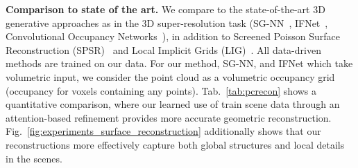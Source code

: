 \smallskip
\noindent \textbf{Comparison to state of the art.}
We compare to the state-of-the-art 3D generative approaches as in the 3D super-resolution task (SG-NN~\cite{dai2020sg}, IFNet~\cite{chibane2020implicit}, Convolutional Occupancy Networks~\cite{peng2020convolutional}), in addition to Screened Poisson Surface Reconstruction (SPSR)~\cite{kazhdan2006poisson,kazhdan2013screened} and Local Implicit Grids (LIG)~\cite{jiang2020local}.
%
All data-driven methods are trained on our data.
%
For our method, SG-NN, and IFNet which take volumetric input, we consider the point cloud as a volumetric occupancy grid (occupancy for voxels containing any points). 
%
Tab.~\ref{tab:pcrecon} shows a quantitative comparison, where our learned use of train scene data through an attention-based refinement provides more accurate geometric reconstruction.
%
Fig.~\ref{fig:experiments_surface_reconstruction} additionally shows that our reconstructions more effectively capture both global structures and local details in the scenes.
%
